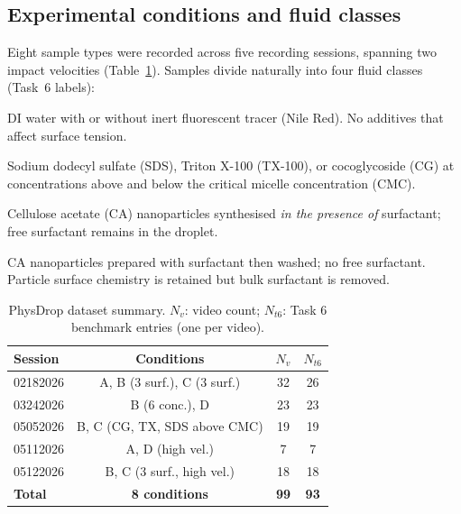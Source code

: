 \documentclass[10pt,twocolumn,letterpaper]{article}
\begin{document}
\subsection{Experimental conditions and fluid classes}

Eight sample types were recorded across five recording sessions, spanning two
impact velocities (Table~\ref{tab:dataset}).
Samples divide naturally into four fluid classes (Task~6 labels):

\begin{description}[leftmargin=0.5cm, topsep=2pt, itemsep=1pt]
  \item[\textbf{A — Pure water}] DI water with or without inert fluorescent
    tracer (Nile Red). No additives that affect surface tension.
  \item[\textbf{B — Surfactant only}] Sodium dodecyl sulfate (SDS),
    Triton X-100 (TX-100), or cocoglycoside (CG) at concentrations above
    and below the critical micelle concentration (CMC).
  \item[\textbf{C — CA + surfactant}] Cellulose acetate (CA) nanoparticles
    synthesised \emph{in the presence of} surfactant; free surfactant
    remains in the droplet.
  \item[\textbf{D — Washed CA}] CA nanoparticles prepared with surfactant
    then washed; no free surfactant. Particle surface chemistry is
    retained but bulk surfactant is removed.
\end{description}

\begin{table}[t]
\centering
\caption{PhysDrop dataset summary. $N_v$: video count; $N_{t6}$: Task 6
benchmark entries (one per video).}
\label{tab:dataset}
\small
\begin{tabular}{lccc}
\toprule
Session & Conditions & $N_v$ & $N_{t6}$ \\
\midrule
02182026 & A, B (3 surf.), C (3 surf.) & 32 & 26 \\
03242026 & B (6 conc.), D & 23 & 23 \\
05052026 & B, C (CG, TX, SDS above CMC) & 19 & 19 \\
05112026 & A, D (high vel.) & 7 & 7 \\
05122026 & B, C (3 surf., high vel.) & 18 & 18 \\
\midrule
\textbf{Total} & \textbf{8 conditions} & \textbf{99} & \textbf{93} \\
\bottomrule
\end{tabular}
\end{table}
\end{document}
